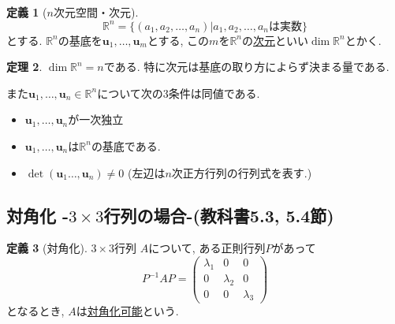 \documentclass[dvipdfmx,a4paper,11pt]{article}
\newcommand{\R}{\mathbb{R}}
\theoremstyle{definition}
\newtheorem{thm}{定理}
\newtheorem{dfn}[thm]{定義}
\begin{document}
 \begin{tcolorbox}[
    colback = white,
    colframe = green!35!black,
    fonttitle = \bfseries,
    breakable = true]
    \begin{dfn}[$n$次元空間・次元]
$$
\R^n  = \{ (a_1, a_2, \ldots, a_n) | \text{$a_1, a_2, \ldots, a_n$は実数}\} 
$$
とする. 
$\R^n$の基底を$\bm{u}_1, \ldots, \bm{u}_m$とする, この$m$を$\R^n$の\underline{次元}といい$\dim \R^n$とかく.
    \end{dfn}
 \end{tcolorbox}
 
 
  \begin{tcolorbox}[
    colback = white,
    colframe = green!35!black,
    fonttitle = \bfseries,
    breakable = true]
    \begin{thm}
$\dim \R^n =n$である. 特に次元は基底の取り方によらず決まる量である.

また$\bm{u}_1, \ldots, \bm{u}_n \in \R^n$について次の3条件は同値である.
 \begin{itemize}
 \setlength{\parskip}{0cm}
  	\setlength{\itemsep}{0pt} 
 \item $\bm{u}_1, \ldots, \bm{u}_n$が一次独立
  \item $\bm{u}_1, \ldots, \bm{u}_n$は$\R^n$の基底である. 
\item  $\det 
(\bm{u}_1 \ldots,\bm{u}_n)
  \neq 0$ (左辺は$n$次正方行列の行列式を表す.)
  \end{itemize}
    \end{thm}
 \end{tcolorbox}
 

\subsection{対角化 -$3 \times 3$行列の場合-(教科書5.3, 5.4節)}

  \begin{tcolorbox}[
    colback = white,
    colframe = green!35!black,
    fonttitle = \bfseries,
    breakable = true]
    \begin{dfn}[対角化]
    
$3 \times 3$行列
$A$について, ある正則行列$P$があって
$$
P^{-1} A P=
\begin{pmatrix}
\lambda_1& 0 &0\\
0& \lambda_2 &0\\
0 & 0& \lambda_3
\end{pmatrix}
$$
となるとき, $A$は\underline{対角化可能}という.
  \end{dfn}
 \end{tcolorbox}
\end{document}
